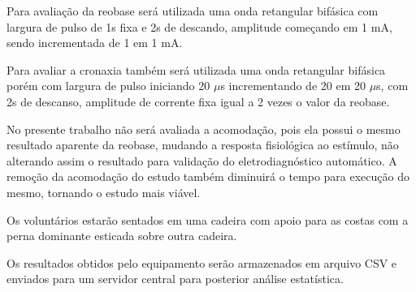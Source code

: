 Para avaliação da reobase será utilizada uma onda retangular bifásica com largura de pulso de 1s fixa e 2s de descando, amplitude começando em 1 mA, sendo incrementada de 1 em 1 mA.

Para avaliar a cronaxia também será utilizada uma onda retangular bifásica porém com largura de pulso iniciando 20 $\mu$s incrementando de 20 em 20 $\mu$s, com 2s de descanso, amplitude de corrente fixa igual a 2 vezes o valor da reobase.

No presente trabalho não será avaliada a acomodação, pois ela possui o mesmo resultado aparente da reobase, mudando a resposta fisiológica ao estímulo, não alterando assim o resultado para validação do eletrodiagnóstico automático. A remoção da acomodação do estudo também diminuirá o tempo para execução do mesmo, tornando o estudo mais viável.

Os voluntários estarão sentados em uma cadeira com apoio para as costas com a perna dominante esticada sobre outra cadeira.

Os resultados obtidos pelo equipamento serão armazenados em arquivo CSV e enviados para um servidor central para posterior análise estatística.